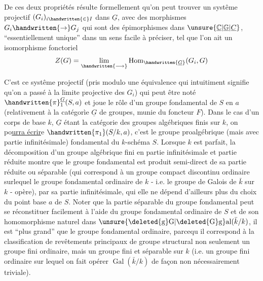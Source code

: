 De ces deux propriétés résulte formellement qu'on peut trouver un systême projectif  $(G_i)_{i\handwritten{\in}I}$ dans $\underline{G}$, avec des morphismes $G_i\handwritten{\to}G_j$ qui sont des épimorphismes dans $\unsure{\underline{\mathbb{C}}|\underline{\mathbb{G}}|\underline{C}}$, ``essentiellement unique'' dans un sens facile à préciser, tel que  l'on ait un isomorphisme fonctoriel
\[
Z(G)=\underset{\handwritten{\longrightarrow}}{\lim}\operatorname{Hom}_{\handwritten{\underline{G}}}(G_i,G)
\]

C'est ce systême projectif (pris modulo une équivalence qui intuitiment signifie qu'on a passé à la limite projective des $G_i$) qui peut être noté $\handwritten{\pi}^{\underline{G}}_1(S,a)$ et joue le rôle d'un groupe fondamental de $S$ en $a$ (relativement à la catégorìe $\underline{G}$ de groupes, munie du foncteur $F$). Dans le cas  d'un corps de base $k$, $\underline{G}$ étant la catégorie des groupes algébriques finis sur $k$, on po\uline{urra écrir}e $\handwritten{\pi_1}(S/k,a)$, c'est le groupe proalgébrique (mais avec partie infinitésimale) fondamental du $k$-schéma $S$. Lorsque $k$ est parfait, la décomposition d'un groupe algébrique fini en partie infinitésimale et partie réduite montre que le groupe fondamental est produit semi-direct de sa partie réduite ou séparable  (qui correspond à un groupe compact discontinu ordinaire\handwritten{,} surlequel le groupe fondamental ordinaire de $k$ - i.e. le groupe de Galois de $\bar{k}$ sur $k$ - opère), par sa partie infinitésimale,  qui elle ne dépend d'ailleurs plus du choix du point base $a$ de $S$. Noter que la partie séparable du groupe fondamental peut se réconstituer facilement à l'aide du groupe fondamental ordinaire de $S$ et de son homomorphisme naturel dans $\unsure{\deleted{\mathrm{g}}\mathrm{G}|\deleted{\mathrm{G}}\mathrm{g}}\mathrm{al}(\bar{k}/k)$,  il est ``plus grand'' que le groupe fondamental ordinaire, parce\inserted{\handwritten{\,}}qu il correspond à la classification de revêtements principaux de groupe structural non seulement un groupe fini ordinaire, mais un groupe  fini et séparable sur $k$ (i.e. un groupe fini ordinaire sur lequel on fait opérer $\operatorname{Gal}(\bar{k}/k)$ de façon non nécessairement triviale). 

